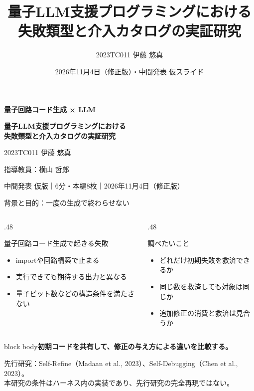 \documentclass[dvipdfmx,aspectratio=169,11pt]{beamer}
\title{量子LLM支援プログラミングにおける\\失敗類型と介入カタログの実証研究}
\author{2023TC011 伊藤 悠真}
\date{2026年11月4日（修正版）・中間発表 仮スライド}
\newcommand{\takeaway}[1]{\vspace{2mm}\begin{beamercolorbox}[wd=\textwidth,sep=2mm]{block body}\small\bfseries #1\end{beamercolorbox}}
\newcommand{\smallnote}[1]{{\scriptsize\color{Muted}#1\par}}
\begin{document}
\begin{frame}[plain]
\vspace{4mm}
{\small\color{Teal}\bfseries 量子回路コード生成 × LLM}\par\vspace{5mm}
{\Large\bfseries 量子LLM支援プログラミングにおける\\失敗類型と介入カタログの実証研究}\par\vspace{4mm}
\vspace{6mm}
{\normalsize 2023TC011 伊藤 悠真}\par\vspace{1mm}
{\small 指導教員：横山 哲郎}\par\vspace{5mm}
{\scriptsize\color{Muted} 中間発表 仮版｜6分・本編8枚｜2026年11月4日（修正版）}
\end{frame}

\begin{frame}{背景と目的：一度の生成で終わらせない}
\begin{columns}[T,onlytextwidth]
\begin{column}{.48\textwidth}
\begin{block}{量子回路コード生成で起きる失敗}
\small
\begin{itemize}
\item importや回路構築で止まる
\item 実行できても期待する出力と異なる
\item 量子ビット数などの構造条件を満たさない
\end{itemize}
\end{block}
\end{column}
\begin{column}{.48\textwidth}
\begin{block}{調べたいこと}
\small
\begin{itemize}
\item どれだけ初期失敗を救済できるか
\item 同じ数を救済しても対象は同じか
\item 追加修正の消費と救済は見合うか
\end{itemize}
\end{block}
\end{column}
\end{columns}
\vspace{3mm}
\takeaway{初期コードを共有して、修正の与え方による違いを比較する。}
\vspace{2mm}
\smallnote{先行研究：Self-Refine（Madaan et al., 2023）、Self-Debugging（Chen et al., 2023）。\\本研究の条件はハーネス内の実装であり、先行研究の完全再現ではない。}
\end{frame}
\end{document}
